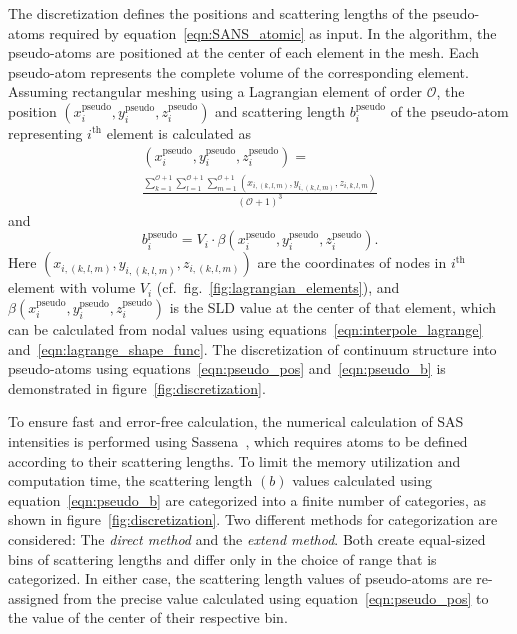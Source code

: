 \documentclass[preprint, 5p, times, twocolumn]{elsarticle}
\begin{document}
The discretization defines the positions and scattering lengths of the pseudo-atoms required by equation~\ref{eqn:SANS_atomic} as input. In the algorithm, the pseudo-atoms are positioned at the center of each element in the mesh. Each pseudo-atom represents the complete volume of the corresponding element. Assuming rectangular meshing using a Lagrangian element of order $\mathcal{O}$, the position $(x_{i}^{\text{pseudo}}, y_{i}^{\text{pseudo}}, z_{i}^{\text{pseudo}})$ and scattering length $b_{i}^{\text{pseudo}}$ of the pseudo-atom representing $i^{\text{th}}$ element is calculated as
%
\begin{multline}
\label{eqn:pseudo_pos}
    (x_{i}^{\text{pseudo}}, y_{i}^{\text{pseudo}}, z_{i}^{\text{pseudo}})  = \\
    \frac{\sum^{\mathcal{O}+1}_{k=1}\sum^{\mathcal{O}+1}_{l=1}\sum^{\mathcal{O}+1}_{m=1} (x_{i,(k,l,m)}, y_{i,(k,l,m)}, z_{i,k,l,m})}{(\mathcal{O}+1)^3}
\end{multline}
%
and
%
\begin{equation}
\label{eqn:pseudo_b}
   b_{i}^{\text{pseudo}} = V_i \cdot \beta(x_{i}^{\text{pseudo}}, y_{i}^{\text{pseudo}}, z_{i}^{\text{pseudo}}) .
\end{equation}
%
Here $(x_{i,(k,l,m)}, y_{i,(k,l,m)}, z_{i,(k,l,m)})$ are the coordinates of nodes in $i^{\text{th}}$ element with volume $V_i$ (cf.\ fig.~\ref{fig:lagrangian_elements}), and $\beta(x_{i}^{\text{pseudo}}, y_{i}^{\text{pseudo}}, z_{i}^{\text{pseudo}})$ is the SLD value at the center of that element, which can be calculated from nodal values using equations~\ref{eqn:interpole_lagrange} and~\ref{eqn:lagrange_shape_func}. The discretization of continuum structure into pseudo-atoms using equations~\ref{eqn:pseudo_pos} and~\ref{eqn:pseudo_b} is demonstrated in figure~\ref{fig:discretization}. 

To ensure fast and error-free calculation, the numerical calculation of SAS intensities is performed using Sassena~\cite{lindner2012sassena, lindner2012towards, sassenaorg, sassena}, which requires atoms to be defined according to their scattering lengths. To limit the memory utilization and computation time, the scattering length $(b)$ values calculated using equation~\ref{eqn:pseudo_b} are categorized into a finite number of categories, as shown in figure~\ref{fig:discretization}. Two different methods for categorization are considered: The \emph{direct method} and the \emph{extend method}. Both create equal-sized bins of scattering lengths and differ only in the choice of range that is categorized. In either case, the scattering length values of pseudo-atoms are re-assigned from the precise value calculated using equation~\ref{eqn:pseudo_pos} to the value of the center of their respective bin.
\end{document}
